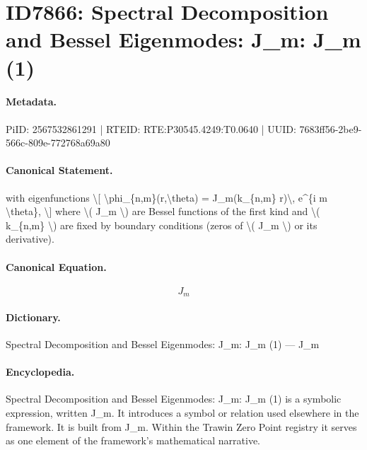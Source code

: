 \section*{ID7866: Spectral Decomposition and Bessel Eigenmodes: J\_m: J\_m (1)}
\paragraph{Metadata.}
PiID: 2567532861291 | RTEID: RTE:P30545.4249:T0.0640 | UUID: 7683ff56-2be9-566c-809e-772768a69a80

\paragraph{Canonical Statement.}
with eigenfunctions \textbackslash{}[ \textbackslash{}phi\_\{n,m\}(r,\textbackslash{}theta) = J\_m(k\_\{n,m\} r)\textbackslash{}, e\textasciicircum{}\{i m \textbackslash{}theta\}, \textbackslash{}] where \textbackslash{}( J\_m \textbackslash{}) are Bessel functions of the first kind and \textbackslash{}( k\_\{n,m\} \textbackslash{}) are fixed by boundary conditions (zeros of \textbackslash{}( J\_m \textbackslash{}) or its derivative).

\paragraph{Canonical Equation.}
\[
J_m
\]

\paragraph{Dictionary.}
Spectral Decomposition and Bessel Eigenmodes: J\_m: J\_m (1) — J\_m

\paragraph{Encyclopedia.}
Spectral Decomposition and Bessel Eigenmodes: J\_m: J\_m (1) is a symbolic expression, written J\_m. It introduces a symbol or relation used elsewhere in the framework. It is built from J\_m. Within the Trawin Zero Point registry it serves as one element of the framework's mathematical narrative.
